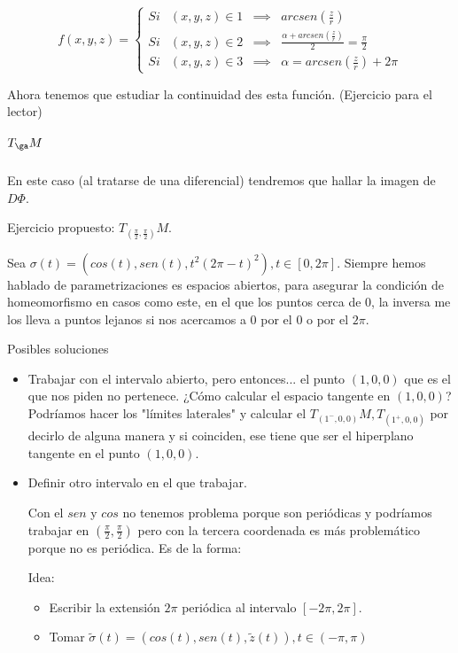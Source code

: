 \[f(x,y,z) =\left\{ \begin{matrix}
Si & (x,y,z) \in 1 &\implies &arcsen\left(\frac{z}{r}\right)\\
Si & (x,y,z) \in 2 &\implies &\frac{\alpha + arcsen\left(\frac{z}{r}\right)}{2} = \frac{\pi}{2}\\
Si & (x,y,z) \in 3 &\implies & \alpha = arcsen\left(\frac{z}{r}\right) + 2\pi
\end{matrix}\right.
\]

Ahora tenemos que estudiar la continuidad des esta función. (Ejercicio para el lector)


\subparagraph{$T_{\ga}M$}

En este caso (al tratarse de una diferencial) tendremos que hallar la imagen de $D\Phi$.

Ejercicio propuesto: $T_{\left(\frac{\pi}{2},\frac{\pi}{2}\right)}M$.


\begin{problem}[4.4]
Sea $\sigma(t) = \left( cos(t),sen(t),t^2(2\pi - t)^2\right), t \in [0,2\pi]$.
\solution
Siempre hemos hablado de parametrizaciones es espacios abiertos, para asegurar la condición de homeomorfismo en casos como este, en el que los puntos cerca de $0$, la inversa me los lleva a puntos lejanos si nos acercamos a $0$ por el $0$ o por el $2\pi$.

Posibles soluciones
\begin{itemize}
\item  Trabajar con el intervalo abierto, pero entonces... el punto $(1,0,0)$ que es el que nos piden no pertenece. ¿Cómo calcular el espacio tangente en $(1,0,0)$? Podríamos hacer los "límites laterales" y calcular el $T_{(1^{-},0,0)}M, T_{(1^{+},0,0)}$ por decirlo de alguna manera y si coinciden, ese tiene que ser el hiperplano tangente en el punto $(1,0,0)$.

\item Definir otro intervalo en el que trabajar. 

Con el $sen$ y $cos$ no tenemos problema porque son periódicas y podríamos trabajar en $\left(\frac{\pi}{2},\frac{\pi}{2}\right)$ pero con la tercera coordenada es más problemático porque no es periódica. Es de la forma:


Idea: 
\begin{itemize}
\item Escribir la extensión $2\pi$ periódica al intervalo $[-2\pi,2\pi]$.
\item Tomar $\tilde{\sigma}(t) = (cos(t),sen(t),\tilde{z}(t)), t\in (-\pi,\pi)$
\end{itemize}
\end{itemize}

\end{problem}